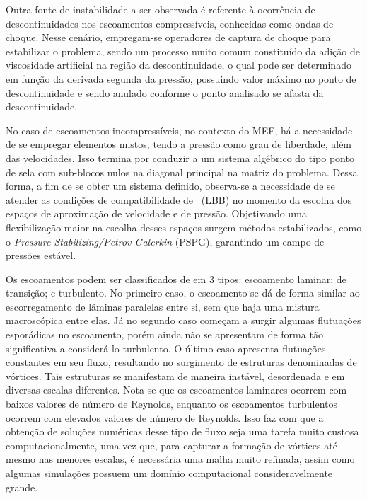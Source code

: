 Outra fonte de instabilidade a ser observada é referente à ocorrência de descontinuidades nos escoamentos compressíveis, conhecidas como ondas de choque. Nesse cenário, empregam-se operadores de captura de choque para estabilizar o problema, sendo um processo muito comum constituído da adição de viscosidade artificial na região da descontinuidade, o qual pode ser determinado em função da derivada segunda da pressão, possuindo valor máximo no ponto de descontinuidade e sendo anulado conforme o ponto analisado se afasta da descontinuidade.

No caso de escoamentos incompressíveis, no contexto do MEF, há a necessidade de se empregar elementos mistos, tendo a pressão como grau de liberdade, além das velocidades. Isso termina por conduzir a um sistema algébrico do tipo ponto de sela com sub-blocos nulos na diagonal principal na matriz do problema. Dessa forma, a fim de se obter um sistema definido, observa-se a necessidade de se atender as condições de compatibilidade de \LBB\ (LBB) no momento da escolha dos espaços de aproximação de velocidade e de pressão. Objetivando uma flexibilização maior na escolha desses espaços surgem métodos estabilizados, como o \textit{Pressure-Stabilizing/Petrov-Galerkin} (PSPG), garantindo um campo de pressões estável.


Os escoamentos podem ser classificados de em 3 tipos: escoamento laminar; de transição; e turbulento. No primeiro caso, o escoamento se dá de forma similar ao escorregamento de lâminas paralelas entre si, sem que haja uma mistura macroscópica entre elas. Já no segundo caso começam a surgir algumas flutuações esporádicas no escoamento, porém ainda não se apresentam de forma tão significativa a considerá-lo turbulento. O último caso apresenta flutuações constantes em seu fluxo, resultando no surgimento de estruturas denominadas de vórtices. Tais estruturas se manifestam de maneira instável, desordenada e em diversas escalas diferentes. Nota-se que os escoamentos laminares ocorrem com baixos valores de número de Reynolds, enquanto os escoamentos turbulentos ocorrem com elevados valores de número de Reynolds. Isso faz com que a obtenção de soluções numéricas desse tipo de fluxo seja uma tarefa muito custosa computacionalmente, uma vez que, para capturar a formação de vórtices até mesmo nas menores escalas, é necessária uma malha muito refinada, assim como algumas simulações possuem um domínio computacional consideravelmente grande.

